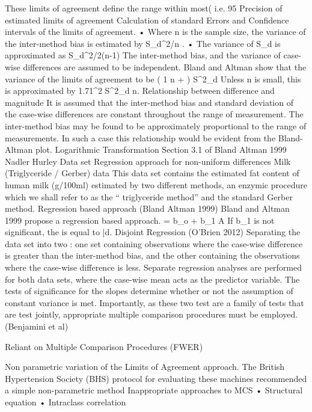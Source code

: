 These limits of agreement define the range within most( i.e. 95%
Precision of estimated limits of agreement
Calculation of standard Errors and Confidence intervals of the limits of agreement.
•	Where n is the sample size, the variance of the inter-method bias is estimated by S_d^2/n .
•	The variance of S_d  is approximated as S_d^2/2(n-1)
The inter-method bias, and the variance of case-wise differences are assumed to be independent.
Bland and Altman show that the variance of the limits of agreement to be
\left( {1 \over n} +  \right) S^2_d
Unless n is small, this is approximated by 1.71^2 {S^2_d \over n}.
Relationship between difference and magnitude
It is assumed that the inter-method bias and standard deviation of the case-wise differences are constant throughout the range of measurement.
The inter-method bias may be found to be approximately proportional to the range of measurements. In such a case this relationship would be evident from the Bland-Altman plot.
Logarithmic Transformation
	Section 3.1 of Bland Altman 1999
	Nadler Hurley Data set
Regression approach for non-uniform differences
Milk (Triglyceride /  Gerber) data
This data set contains the estimated fat content of human milk (g/100ml) estimated by two different methods, an enzymic procedure which we shall refer to as the “ triglyceride method” and the standard Gerber method.
Regression based approach (Bland Altman 1999)
Bland and Altman 1999 propose a regression based approach.
 = b_o + b_1 A
If b_1 is not significant, the  is equal to \bar{d}.
Disjoint Regression (O’Brien 2012)
Separating the data set into two : one set containing observations where the case-wise difference is greater than the inter-method bias, and the other containing the observations where the case-wise difference is less.
Separate regression analyses are performed for both data sets, where the case-wise mean acts as the predictor variable. The tests of significance for the slopes determine whether or not the assumption of constant variance is met.
Importantly, as these two test are a family of tests that are test jointly, appropriate multiple comparison procedures must be employed.  (Benjamini et al) 

	Reliant on Multiple Comparison Procedures (FWER)


Non parametric variation of the Limits of Agreement  approach.
The British Hypertension Society (BHS) protocol for evaluating these machines recommended a simple non-parametric method
Inappropriate approaches to MCS
•	Structural equation 
•	Intraclass correlation

